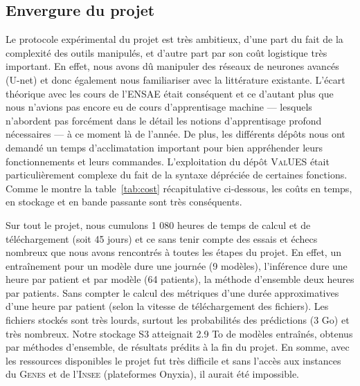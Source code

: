 \documentclass[a4paper,french,bookmarks,12pt]{article}
\begin{document}
    \subsection{Envergure du projet}
    
    
    Le protocole expérimental du projet est très ambitieux, d'une part du fait de la complexité des outils manipulés, et d'autre part par son coût logistique très important. En effet, nous avons dû manipuler des réseaux de neurones avancés (U-net) et donc également nous familiariser avec la littérature existante. L'écart théorique avec les cours de l'ENSAE était conséquent et ce d'autant plus que nous n'avions pas encore eu de cours d'apprentisage machine --- lesquels n'abordent pas forcément dans le détail les notions d'apprentisage profond nécessaires --- à ce moment là de l'année. De plus, les différents dépôts nous ont demandé un temps d'acclimatation important pour bien appréhender leurs fonctionnements et leurs commandes. L'exploitation du dépôt \textsc{ValUES} était particulièrement complexe du fait de la syntaxe dépréciée de certaines fonctions. Comme le montre la table~\ref{tab:cost} récapitulative ci-dessous, les coûts en temps, en stockage et en bande passante sont très conséquents.

    Sur tout le projet, nous cumulons 1 080 heures de temps de calcul et de téléchargement (soit 45 jours) et ce sans tenir compte des essais et échecs nombreux que nous avons rencontrés à toutes les étapes du projet. En effet, un entraînement pour un modèle dure une journée (9 modèles), l'inférence dure une heure par patient et par modèle (64 patients), la méthode d'ensemble deux heures par patients. Sans compter le calcul des métriques d'une durée approximatives d'une heure par patient (selon la vitesse de téléchargement des fichiers). Les fichiers stockés sont très lourds, surtout les probabilités des prédictions (3 Go) et très nombreux. Notre stockage S3 atteignait 2.9 To de modèles entraînés, obtenus par méthodes d'ensemble, de résultats prédits à la fin du projet. En somme, avec les ressources disponibles le projet fut très difficile et sans l'accès aux instances du \textsc{Genes} et de l'\textsc{Insee} (plateformes Onyxia), il aurait été impossible.
\end{document}
